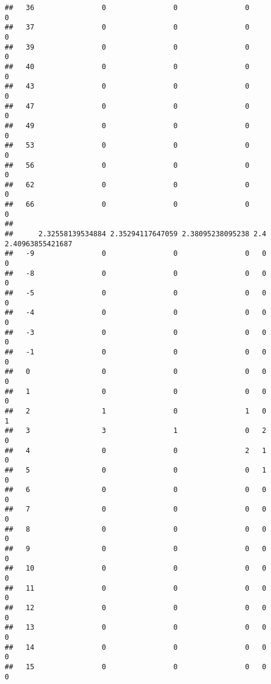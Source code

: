 \documentclass[]{article}
\begin{document}
\begin{verbatim}
##   36                0                0                0               0
##   37                0                0                0               0
##   39                0                0                0               0
##   40                0                0                0               0
##   43                0                0                0               0
##   47                0                0                0               0
##   49                0                0                0               0
##   53                0                0                0               0
##   56                0                0                0               0
##   62                0                0                0               0
##   66                0                0                0               0
##     
##      2.32558139534884 2.35294117647059 2.38095238095238 2.4 2.40963855421687
##   -9                0                0                0   0                0
##   -8                0                0                0   0                0
##   -5                0                0                0   0                0
##   -4                0                0                0   0                0
##   -3                0                0                0   0                0
##   -1                0                0                0   0                0
##   0                 0                0                0   0                0
##   1                 0                0                0   0                0
##   2                 1                0                1   0                1
##   3                 3                1                0   2                0
##   4                 0                0                2   1                0
##   5                 0                0                0   1                0
##   6                 0                0                0   0                0
##   7                 0                0                0   0                0
##   8                 0                0                0   0                0
##   9                 0                0                0   0                0
##   10                0                0                0   0                0
##   11                0                0                0   0                0
##   12                0                0                0   0                0
##   13                0                0                0   0                0
##   14                0                0                0   0                0
##   15                0                0                0   0                0

\end{verbatim}
\end{document}
